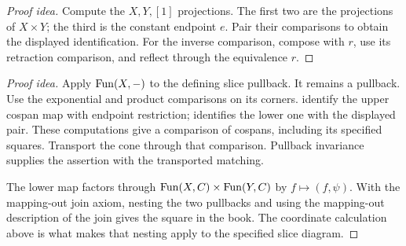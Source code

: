 \documentclass[11pt]{article}
\begin{document}
\begin{proof}[Proof idea]
Compute the $X,Y,[1]$ projections. The first two are the projections of
$X\times Y$; the third is the constant endpoint $e$.
Pair their comparisons to obtain the displayed identification.
For the inverse comparison, compose with $r$, use its retraction
comparison, and reflect through the equivalence $r$.
\end{proof}

\begin{proof}[Proof idea]
Apply $\operatorname{Fun}(X,-)$ to the defining slice pullback. It remains a pullback.
Use the exponential and product comparisons on its corners.
identify the upper cospan map with endpoint restriction;
 identifies the lower one with
the displayed pair. These computations give a comparison of cospans,
including its specified squares. Transport the cone through that comparison.
Pullback invariance supplies the assertion with the transported matching.

The lower map factors through
$\operatorname{Fun}(X,C)\times\operatorname{Fun}(Y,C)$ by $f\mapsto(f,\psi)$.
With the mapping-out join axiom, nesting the two pullbacks and using
the mapping-out description of the join gives the square in the book. The coordinate calculation above is
what makes that nesting apply to the specified slice diagram.
\end{proof}
\end{document}

